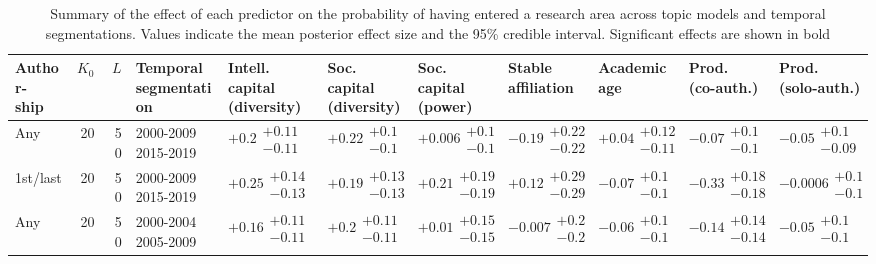\begin{table}[H]
\caption{Summary of the effect of each predictor on the probability of having entered a research area across topic models and temporal segmentations. Values indicate the mean posterior effect size and the 95\% credible interval. Significant effects are shown in bold}
\label{table:full_summary_entered}
\renewcommand{\arraystretch}{2}\fontsize{6}{7}\selectfont\begin{tabular}{lrrllllllll}
\toprule
\makecell{Author-\\ ship} & $K_0$ & $L$ & \makecell{Temporal \\ segmentation} & \makecell{Intell. capital \\ (diversity)} & \makecell{Soc. capital \\ (diversity)} & \makecell{Soc. capital \\ (power)} & \makecell{Stable \\ affiliation} & \makecell{Academic \\ age} & \makecell{Prod. \\ (co-auth.)} & \makecell{Prod. \\ (solo-auth.)} \\
\midrule
Any & 20 & 50 & \makecell{2000-2009 \\ 2015-2019} & $\bm{+0.2}\substack{+0.11 \\ -0.11}$ & $\bm{+0.22}\substack{+0.1 \\ -0.1}$ & $+0.006\substack{+0.1 \\ -0.1}$ & $-0.19\substack{+0.22 \\ -0.22}$ & $+0.04\substack{+0.12 \\ -0.11}$ & $-0.07\substack{+0.1 \\ -0.1}$ & $-0.05\substack{+0.1 \\ -0.09}$ \\
1st/last & 20 & 50 & \makecell{2000-2009 \\ 2015-2019} & $\bm{+0.25}\substack{+0.14 \\ -0.13}$ & $\bm{+0.19}\substack{+0.13 \\ -0.13}$ & $\bm{+0.21}\substack{+0.19 \\ -0.19}$ & $+0.12\substack{+0.29 \\ -0.29}$ & $-0.07\substack{+0.1 \\ -0.1}$ & $\bm{-0.33}\substack{+0.18 \\ -0.18}$ & $-0.0006\substack{+0.1 \\ -0.1}$ \\
Any & 20 & 50 & \makecell{2000-2004 \\ 2005-2009} & $\bm{+0.16}\substack{+0.11 \\ -0.11}$ & $\bm{+0.2}\substack{+0.11 \\ -0.11}$ & $+0.01\substack{+0.15 \\ -0.15}$ & $-0.007\substack{+0.2 \\ -0.2}$ & $-0.06\substack{+0.1 \\ -0.1}$ & $\bm{-0.14}\substack{+0.14 \\ -0.14}$ & $-0.05\substack{+0.1 \\ -0.1}$ \\

\end{tabular}
\end{table}
